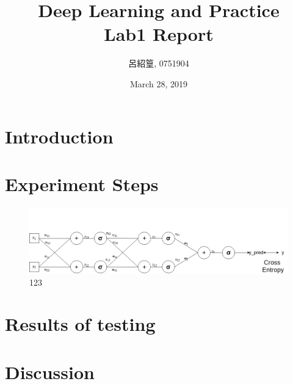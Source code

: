 \documentclass{article}
\title{Deep Learning and Practice \\Lab1 Report}
\date{March 28, 2019}
\author{呂紹篁, 0751904}
\begin{document}
\maketitle
\section{Introduction}
\section{Experiment Steps}
\begin{figure}
  \includegraphics[scale=0.4]{DLP_report1_nn.png}
  \centering
  \caption{123}
\end{figure}
\section{Results of testing}
\section{Discussion}
\end{document}
